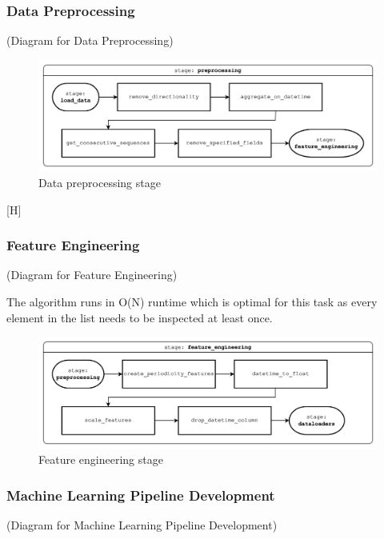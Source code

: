 \subsubsection{Data Preprocessing}
\label{subsubsection: imp_data_preprocessing}
(Diagram for Data Preprocessing)

\begin{figure}[H]
    \centering
    \includegraphics[width=\textwidth]{figures/methodology/preprocessing_stage.png}
    \caption{Data preprocessing stage}
    \label{fig:preprocessing}
\end{figure}

[H]

\subsubsection{Feature Engineering}
(Diagram for Feature Engineering)

The algorithm runs in O(N) runtime which is optimal for this task as every element in the list needs to be inspected at least once.

\begin{figure}[H]
    \centering
    \includegraphics[width=\textwidth]{figures/methodology/feature_engineering_stage.png}
    \caption{Feature engineering stage}
    \label{fig:feature_engineering}
\end{figure}

\subsubsection{Machine Learning Pipeline Development}
(Diagram for Machine Learning Pipeline Development)

